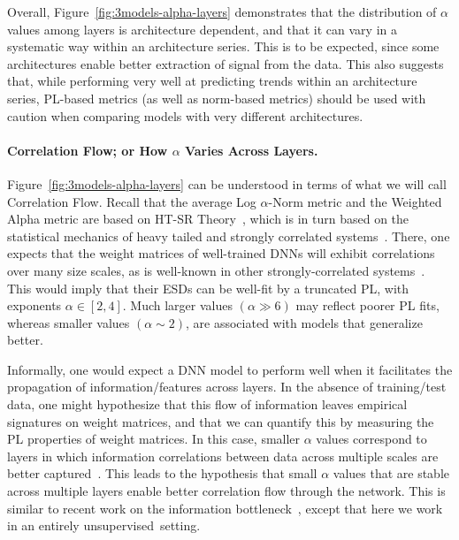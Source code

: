 Overall, Figure~\ref{fig:3models-alpha-layers} demonstrates that the distribution of $\alpha$ values among layers is architecture dependent, 
and that it can vary in a systematic way within an architecture series.
This is to be expected, since some architectures enable better extraction of signal from the data.
This also suggests that, while performing very well at predicting trends within an architecture series, PL-based metrics (as well as norm-based metrics) should be used with caution when comparing models with very different architectures.


\paragraph{Correlation Flow; or How $\alpha$ Varies Across Layers.}

Figure~\ref{fig:3models-alpha-layers} can be understood in terms of what we will call Correlation Flow.
Recall that the average Log $\alpha$-Norm metric and the Weighted Alpha metric are based on HT-SR Theory~\cite{MM18_TR, MM19_HTSR_ICML, MM20_SDM}, which is in turn based on the statistical mechanics of heavy tailed and strongly correlated systems~\cite{BouchaudPotters03, SornetteBook, BP11, bun2017}. 
There, one expects that the weight matrices of well-trained DNNs will exhibit correlations over many size scales, as is well-known in other strongly-correlated systems~\cite{BouchaudPotters03, SornetteBook}. 
This would imply that their ESDs can be well-fit by a truncated PL, with exponents $\alpha\in[2,4]$.
Much larger values $(\alpha\gg 6)$ may reflect poorer PL fits, whereas smaller values $(\alpha\sim 2)$, are associated with models that generalize better.

Informally, one would expect a DNN model to perform well when it facilitates the propagation of information/features across layers.
In the absence of training/test data, one might hypothesize that this flow of information leaves empirical signatures on weight matrices, and that we can quantify this by measuring the PL properties of weight matrices.
In this case, smaller $\alpha$ values correspond to layers in which information correlations between data across multiple scales are better captured~\cite{MM18_TR,SornetteBook}.
This leads to the hypothesis that small $\alpha$ values that are stable across multiple layers enable better correlation flow through the network.
This is similar to recent work on the information bottleneck~\cite{TZ15,ST17_TR}, except that here we work in an entirely unsupervised~setting.

